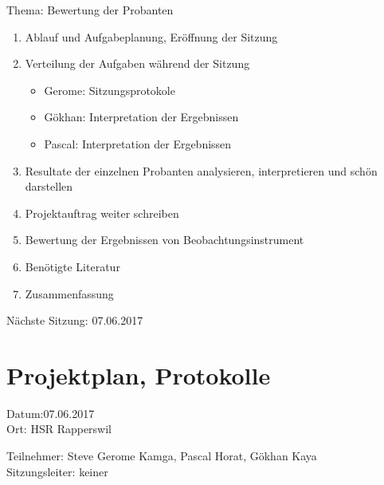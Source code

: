 Thema: Bewertung der Probanten
\begin{enumerate}

\item Ablauf und Aufgabeplanung, Eröffnung der Sitzung 

\item  Verteilung der Aufgaben während der Sitzung
\begin{itemize}
\item Gerome: Sitzungsprotokole
\item Gökhan: Interpretation der Ergebnissen
\item Pascal: Interpretation der Ergebnissen
\end{itemize}

\item Resultate der einzelnen Probanten analysieren, interpretieren und schön darstellen 		

\item 	Projektauftrag weiter schreiben

\item 	Bewertung der Ergebnissen von Beobachtungsinstrument


\item Benötigte Literatur

\item Zusammenfassung

\end{enumerate}

Nächste Sitzung: 07.06.2017

\newpage
\section*{Projektplan, Protokolle}

Datum:07.06.2017\\
Ort: HSR Rapperswil

Teilnehmer: Steve Gerome Kamga, Pascal Horat, Gökhan Kaya\\
Sitzungsleiter: keiner

